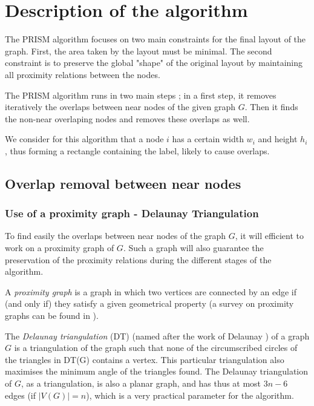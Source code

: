 \documentclass[12pt]{report}
\begin{document}
\section{Description of the algorithm}

The PRISM algorithm focuses on two main constraints for the final layout of the graph. First, the area taken by the layout must be minimal. The second constraint is to preserve the global "shape" of the original layout by maintaining all proximity relations between the nodes.

The PRISM algorithm runs in two main steps ; in a first step, it removes iteratively the overlaps between near nodes of the given graph $G$. Then it finds the non-near overlaping nodes and removes these overlaps as well.

We consider for this algorithm that a node $i$ has a certain width $w_i$ and height $h_i$, thus forming a rectangle containing the label, likely to cause overlaps.

\subsection{Overlap removal between near nodes}

\subsubsection{Use of a proximity graph - Delaunay Triangulation}

To find easily the overlaps between near nodes of the graph $G$, it will efficient to work on a proximity graph of $G$. Such a graph will also guarantee the preservation of the proximity relations during the different stages of the algorithm.

A \emph{proximity graph} is a graph in which two vertices are connected by an edge if (and only if) they satisfy a given geometrical property (a survey on proximity graphs can be found in \cite{JT92}).

\bigskip

The \emph{Delaunay triangulation} (DT) (named after the work of Delaunay \cite{Delaunay34}) of a graph $G$ is a triangulation of the graph such that none of the circumscribed circles of the triangles in DT(G) contains a vertex. This particular triangulation also maximises the minimum angle of the triangles found.
The Delaunay triangulation of $G$, as a triangulation, is also a planar graph, and has thus at most $3n -6$ edges (if $|V(G)| = n$), which is a very practical parameter for the algorithm.
\end{document}
